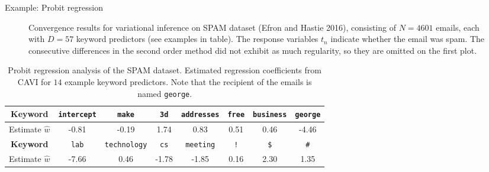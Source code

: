 \documentclass[final]{beamer}
\newlength{\twocolwid}
\begin{document}
\begin{frame}[t]
\begin{columns}[t]
\begin{column}{\twocolwid}
\begin{block}{Example: Probit regression}
\begin{figure}[h]
\begin{subfigure}[t]{0.49\textwidth}
    \end{subfigure}
    \caption{Convergence results for variational inference on SPAM dataset (Efron and Hastie 2016), consisting of $N= 4601$ emails, each with $D=57$ keyword predictors (see examples in table). The response variables $t_n$ indicate whether the email was spam. The consecutive differences in the second order method did not exhibit as much regularity, so they are omitted on the first plot.}
\end{figure}

\vspace{-.5em}

\begin{table}
\begin{tabular}{c | c | c | c | c | c | c | c}
\toprule
\toprule
\textbf{Keyword} & \texttt{intercept} & \texttt{make} & \texttt{3d} & \texttt{addresses} & \texttt{free} & \texttt{business} & \texttt{george} \\
\midrule
Estimate $\widehat w$ & -0.81 & -0.19 & 1.74 & 0.83 & 0.51 & 0.46 & -4.46\\
\midrule
\textbf{Keyword} & \texttt{lab} & \texttt{technology} & \texttt{cs} & \texttt{meeting} & \texttt{!} & \texttt{\$} & \texttt{\#} \\
\midrule
Estimate $\widehat w$ & -7.66 & 0.46 & -1.78 & -1.85 & 0.16 & 2.30 & 1.35\\
\bottomrule
\bottomrule
\end{tabular}

\vspace{.5em}

\caption{Probit regression analysis of the SPAM dataset. Estimated regression coefficients from CAVI for $14$ example keyword predictors. Note that the recipient of the emails is named \texttt{george}.}
\end{table}




\end{block}




%
%
%


\end{column}
\end{columns}
\end{frame}
\end{document}
